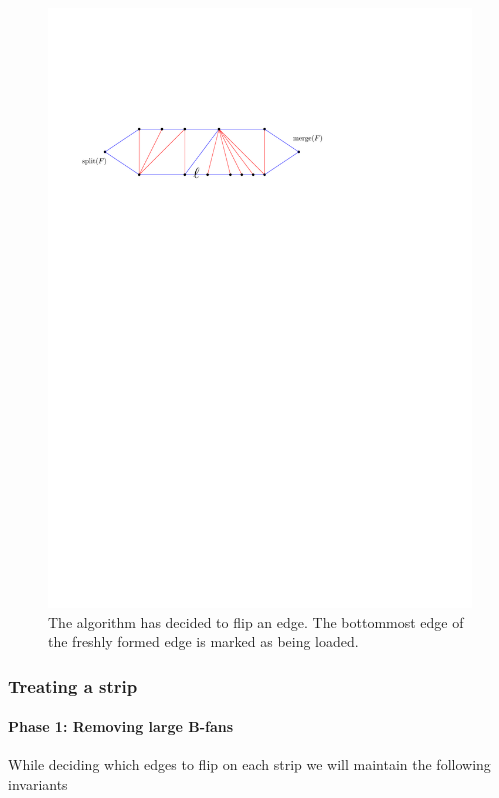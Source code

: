 \begin{figure}[h]
  \centering
  \includegraphics[scale=1]{unifiedAlgo/img/load}
  \caption{The algorithm has decided to flip an edge. The bottommost edge of the freshly formed edge is marked as being loaded. }
  \label{fig:uni:load}
\end{figure}

\subsubsection{Treating a strip}
\paragraph{Phase 1: Removing large B-fans}

While deciding which edges to flip on each strip we will maintain the following invariants

